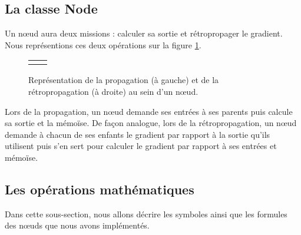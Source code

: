\subsection{La classe Node}

Un n\oe{}ud aura deux missions : calculer sa sortie et rétropropager le gradient. Nous représentions ces deux opérations sur la figure \ref{node}.

\begin{figure}
\begin{center}
\begin{tabular}{cc}
 &  \\
\end{tabular}
\end{center}
\caption{Représentation de la propagation (à gauche) et de la rétropropagation (à droite) au sein d'un n\oe{}ud.}
\label{node}
\end{figure}

Lors de la propagation, un n\oe{}ud demande ses entrées à ses parents puis calcule sa sortie et la mémoïse. De façon analogue, lors de la rétropropagation, un n\oe{}ud demande à chacun de ses enfants le gradient par rapport à la sortie qu'ils utilisent puis s'en sert pour calculer le gradient par rapport à ses entrées et mémoïse.

\subsection{Les opérations mathématiques}

Dans cette sous-section, nous allons décrire les symboles ainsi que les formules des n\oe{}uds que nous avons implémentés. \label{nodes}

